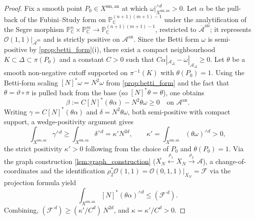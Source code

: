 \begin{proof}
  Fix a smooth point \(P_0 \in X^{\mathrm{sm,an}}\) at which
  \(\omega|_{X^{\mathrm{sm,an}}}^{\wedge d} > 0\). Let \(\alpha\) be the pull-back
  of the Fubini--Study form on \(\mathbb{P}^{(n+1)(m+1)-1}_\mathbb{C}\) under the
  analytification of the Segre morphism
  \(\mathbb{P}^n_\mathbb{C} \times \mathbb{P}^m_\mathbb{C} \to \mathbb{P}^{(n+1)(m+1)-1}_\mathbb{C}\),
  restricted to \(\overline{\mathcal{A}}^{\mathrm{an}}\); it represents
  \(\mathcal{O}(1,1)|_{\overline{\mathcal{A}}^{\mathrm{an}}}\) and is strictly positive on
  \(\mathcal{A}^{\mathrm{an}}\).
  Since the Betti form \(\omega\) is semi-positive by \cref{prop:betti_form}(i),
  there exist a compact neighbourhood \(K \subset \Delta \subset \pi(P_0)\) and
  a constant \(C > 0\) such that \(C\alpha|_{\mathcal{A}_\Delta} - \omega|_{\mathcal{A}_\Delta} \ge 0\).
  Let \(\theta\) be a smooth non-negative cutoff supported on \(\pi^{-1}(K)\) with
  \(\theta(P_0) = 1\). Using the Betti-form scaling \([N]^*\omega = N^2\omega\)
  from \cref{prop:betti_form} and the fact that \(\theta = \vartheta \circ \pi\) is
  pulled back from the base (so \([N]^*\theta = \theta\)), one obtains
  \[
    \beta := C [N]^*(\theta\alpha) - N^2\theta\omega \ge 0
    \quad \text{on } \mathcal{A}^{\mathrm{an}}.
  \]
  Writing \(\gamma = C [N]^*(\theta\alpha)\) and \(\delta = N^2\theta\omega\), both
  semi-positive with compact support, a wedge-positivity argument
  \cite[Proposition~III.1.11]{Demailly} gives
  \[
    \int_{X^{\mathrm{sm,an}}} \gamma^{\wedge d}
    \ge \int_{X^{\mathrm{sm,an}}} \delta^{\wedge d}
    = \kappa' N^{2d}, \qquad
    \kappa' = \int_{X^{\mathrm{sm,an}}} (\theta\omega)^{\wedge d} > 0,
  \]
  the strict positivity \(\kappa' > 0\) following from the choice of \(P_0\) and
  \(\theta(P_0) = 1\). Via the graph construction \cref{lem:graph_construction}
  (\(\overline{X_N} \xleftarrow{\rho_1} X_N \xrightarrow{\rho_2} \mathcal{A}\)),
  a change-of-coordinates and the identification
  \(\rho_2^*\mathcal{O}(1,1) = \mathcal{O}(0,1,1)|_{\overline{X_N}} = \mathcal{F}\)
  via the projection formula yield
  \[
    \int_{X^{\mathrm{sm,an}}} [N]^*(\theta\alpha)^{\wedge d} \le (\mathcal{F}^{\cdot d}).
  \]
  Combining, \((\mathcal{F}^{\cdot d}) \ge (\kappa'/C^d)\,N^{2d}\), and
  \(\kappa = \kappa'/C^d > 0\).
\end{proof}

